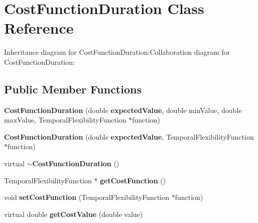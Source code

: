 \section{CostFunctionDuration Class Reference}
\label{classbr_1_1pucrio_1_1telemidia_1_1ginga_1_1ncl_1_1model_1_1time_1_1CostFunctionDuration}
Inheritance diagram for CostFunctionDuration:Collaboration diagram for CostFunctionDuration:\subsection*{Public Member Functions}
\begin{CompactItemize}
\item 
\textbf{CostFunctionDuration} (double {\bf expectedValue}, double minValue, double maxValue, TemporalFlexibilityFunction $\ast$function)\label{classbr_1_1pucrio_1_1telemidia_1_1ginga_1_1ncl_1_1model_1_1time_1_1CostFunctionDuration_0c84b41a8ba897dc1cbd9962270bbcee}

\item 
\textbf{CostFunctionDuration} (double {\bf expectedValue}, TemporalFlexibilityFunction $\ast$function)\label{classbr_1_1pucrio_1_1telemidia_1_1ginga_1_1ncl_1_1model_1_1time_1_1CostFunctionDuration_78df6ebb5432a7bb579f2f991dc1cc79}

\item 
virtual {\bf $\sim$CostFunctionDuration} ()\label{classbr_1_1pucrio_1_1telemidia_1_1ginga_1_1ncl_1_1model_1_1time_1_1CostFunctionDuration_70080acfb6c501d024d7ae234503a354}

\item 
TemporalFlexibilityFunction $\ast$ \textbf{getCostFunction} ()\label{classbr_1_1pucrio_1_1telemidia_1_1ginga_1_1ncl_1_1model_1_1time_1_1CostFunctionDuration_5492a98cc07385b3cc0aa8414e1b45b2}

\item 
void \textbf{setCostFunction} (TemporalFlexibilityFunction $\ast$function)\label{classbr_1_1pucrio_1_1telemidia_1_1ginga_1_1ncl_1_1model_1_1time_1_1CostFunctionDuration_021433a2fbebc63c5f488fde4948443e}

\item 
virtual double \textbf{getCostValue} (double value)\label{classbr_1_1pucrio_1_1telemidia_1_1ginga_1_1ncl_1_1model_1_1time_1_1CostFunctionDuration_6ca91f69c1c2946ab924d505d562bf51}

\end{CompactItemize}
